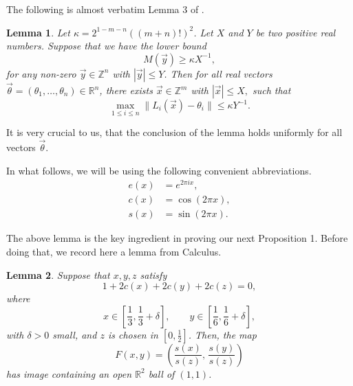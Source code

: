 \documentclass[10pt,a4paper]{amsart}
\newtheorem{lemma}{Lemma}
\newcommand{\Z}{\mathbb{Z}}
\begin{document}
The following is almost verbatim Lemma 3 of \cite{transfer}.
\begin{lemma}
    Let $\kappa=2^{1-m-n}((m+n)!)^2$. Let $X$ and $Y$ be two positive real numbers. Suppose that we have the lower bound
    \begin{equation}
        M(\vec{y})\geq \kappa X^{-1},
    \end{equation}
    for any non-zero $\vec{y}\in\Z^n$ with $|\vec{y}|\leq Y$. Then for all real vectors $\vec{\theta}=(\theta_1,\dots,\theta_n)\in\mathbb{R}^n$, there exists $\vec{x}\in\Z^m$ with $|\vec{x}|\leq X,$ such that 
    \begin{equation}\label{inhom}
        \max_{1\leq i\leq n} \|L_i(\vec{x})-\theta_i   \|\leq \kappa Y^{-1}.
    \end{equation}
\end{lemma}
It is very crucial to us, that the conclusion of the lemma holds uniformly for all vectors $\vec{\theta}$.

In what follows, we will be using the following convenient abbreviations.
\begin{align*}
    e(x)&=e^{2\pi i x},\\
    c(x)&=\cos(2\pi x),\\
    s(x)&=\sin(2\pi x).
\end{align*}

The above lemma is the key ingredient in proving our next Proposition 1. Before doing that, we record here a lemma from Calculus.

\begin{lemma}

Suppose that $x,y,z$ satisfy
\[
1+2c(x)+2c(y)+2c(z)=0,
\]
where
\[
x\in\left[\frac13,\frac13+\delta\right],\qquad
y\in\left[\frac16,\frac16+\delta\right],
\]
with $\delta>0$ small, and $z$ is chosen in $[0,\frac12]$. Then, the map
\[
F(x,y)=\left(\frac{s(x)}{s(z)},\,\frac{s(y)}{s(z)}\right)
\]
has image containing an open $\mathbb{R}^2$ ball of $(1,1)$.
\end{lemma}
\end{document}
